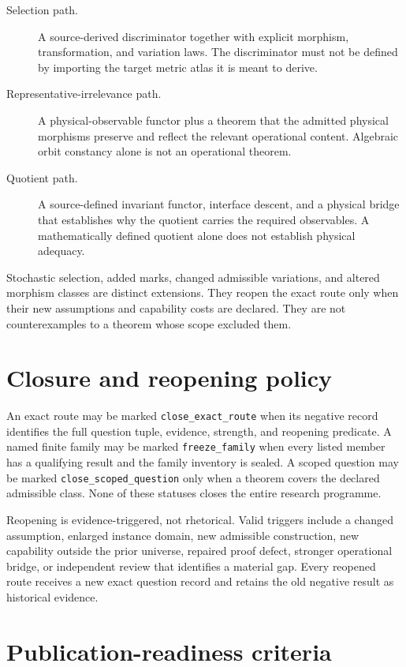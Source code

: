 \documentclass[11pt]{article}
\begin{document}
\begin{description}
  \item[Selection path.] A source-derived discriminator together with explicit
  morphism, transformation, and variation laws.  The discriminator must not be
  defined by importing the target metric atlas it is meant to derive.
  \item[Representative-irrelevance path.] A physical-observable functor plus a
  theorem that the admitted physical morphisms preserve and reflect the
  relevant operational content.  Algebraic orbit constancy alone is not an
  operational theorem.
  \item[Quotient path.] A source-defined invariant functor, interface descent,
  and a physical bridge that establishes why the quotient carries the required
  observables.  A mathematically defined quotient alone does not establish
  physical adequacy.
\end{description}

Stochastic selection, added marks, changed admissible variations, and altered
morphism classes are distinct extensions.  They reopen the exact route only
when their new assumptions and capability costs are declared.  They are not
counterexamples to a theorem whose scope excluded them.

\section{Closure and reopening policy}

An exact route may be marked \texttt{close\_exact\_route} when its negative
record identifies the full question tuple, evidence, strength, and reopening
predicate.  A named finite family may be marked \texttt{freeze\_family} when
every listed member has a qualifying result and the family inventory is
sealed.  A scoped question may be marked \texttt{close\_scoped\_question}
only when a theorem covers the declared admissible class.  None of these
statuses closes the entire research programme.

Reopening is evidence-triggered, not rhetorical.  Valid triggers include a
changed assumption, enlarged instance domain, new admissible construction,
new capability outside the prior universe, repaired proof defect, stronger
operational bridge, or independent review that identifies a material gap.
Every reopened route receives a new exact question record and retains the old
negative result as historical evidence.

\section{Publication-readiness criteria}
\end{document}
